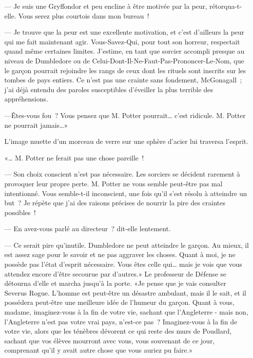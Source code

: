 --- Je suis une Gryffondor et peu encline à être motivée par la peur, rétorqua-t-elle. Vous serez plus courtois dans mon bureau~!

--- Je trouve que la peur est une excellente motivation, et c'est d'ailleurs la peur qui me fait maintenant agir. Vous-Savez-Qui, pour tout son horreur, respectait quand même certaines limites. J'estime, en tant que sorcier accompli presque au niveau de Dumbledore ou de Celui-Dont-Il-Ne-Faut-Pas-Prononcer-Le-Nom, que le garçon pourrait rejoindre les rangs de ceux dont les rituels sont inscrits sur les tombes de pays entiers. Ce n'est pas une crainte sans fondement, McGonagall~; j'ai déjà entendu des paroles susceptibles d'éveiller la plus terrible des appréhensions.

---Êtes-vous fou~? Vous pensez que M. Potter pourrait… c'est ridicule. M. Potter ne pourrait jamais…»

L'image muette d'un morceau de verre sur une sphère d'acier lui traversa l'esprit.

«… M. Potter ne ferait pas une chose pareille~!

--- Son choix conscient n'est pas nécessaire. Les sorciers se décident rarement à provoquer leur propre perte. M. Potter ne vous semble peut-être pas mal intentionné. Vous semble-t-il inconscient, une fois qu'il s'est résolu à atteindre un but~? Je répète que j'ai des raisons précises de nourrir la pire des craintes possibles~!

--- En avez-vous parlé au directeur~? dit-elle lentement.

--- Ce serait pire qu'inutile. Dumbledore ne peut atteindre le garçon. Au mieux, il est assez sage pour le savoir et ne pas aggraver les choses. Quant à moi, je ne possède pas l'état d'esprit nécessaire. Vous êtes celle qui… mais je vois que vous attendez encore d'être secourue par d'autres.» Le professeur de Défense se détourna d'elle et marcha jusqu'à la porte. «Je pense que je vais consulter Severus Rogue. L'homme est peut-être un désastre ambulant, mais il le sait, et il possédera peut-être une meilleure idée de l'humeur du garçon. Quant à vous, madame, imaginez-vous à la fin de votre vie, sachant que l'Angleterre - mais non, l'Angleterre n'est pas votre vrai pays, n'est-ce pas~? Imaginez-vous à la fin de votre vie, alors que les ténèbres dévorent ce qui reste des murs de Poudlard, sachant que vos élèves mourront avec vous, vous souvenant de ce jour, comprenant qu'il y avait autre chose que vous auriez pu faire.» 

